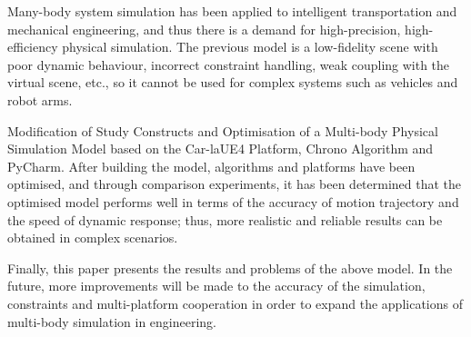 \begin{abstracten}
	
	Many-body system simulation has been applied to intelligent transportation and mechanical engineering, and thus there is a demand for high-precision, high-efficiency physical simulation. The previous model is a low-fidelity scene with poor dynamic behaviour, incorrect constraint handling, weak coupling with the virtual scene, etc., so it cannot be used for complex systems such as vehicles and robot arms.
	
	Modification of Study Constructs and Optimisation of a Multi-body Physical Simulation Model based on the Car-laUE4 Platform, Chrono Algorithm and PyCharm. After building the model, algorithms and platforms have been optimised, and through comparison experiments, it has been determined that the optimised model performs well in terms of the accuracy of motion trajectory and the speed of dynamic response; thus, more realistic and reliable results can be obtained in complex scenarios.
	
	Finally, this paper presents the results and problems of the above model. In the future, more improvements will be made to the accuracy of the simulation, constraints and multi-platform cooperation in order to expand the applications of multi-body simulation in engineering.
	
	
\end{abstracten}